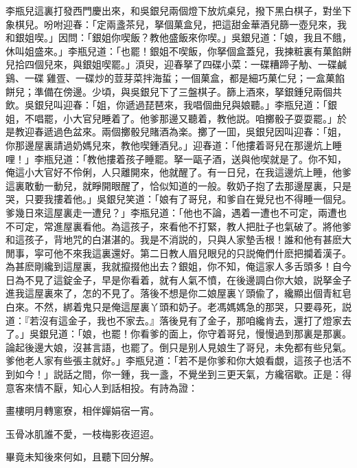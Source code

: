 李瓶兒這裏打發西門慶出來，和吳銀兒兩個燈下放炕桌兒，撥下黑白棋子，對坐下象棋兒。吩咐迎春：「定兩盞茶兒，拏個菓盒兒，把這甜金華酒兒篩一壺兒來，我和銀姐喫。」因問：「銀姐你喫飯？教他盛飯來你喫。」吳銀兒道：「娘，我且不餓，休叫姐盛來。」李瓶兒道：「也罷！銀姐不喫飯，你拏個盒蓋兒，我揀粧裏有菓餡餅兒拾四個兒來，與銀姐喫罷。」湏臾，迎春拏了四碟小菜：一碟糟蹄子觔、一碟鹹鷄、一碟𤓌雞疍、一碟炒的荳芽菜拌海蜇；一個菓盒，都是細巧菓仁兒；一盒菓餡餅兒；準備在傍邊。少頃，與吳銀兒下了三盤棋子。篩上酒來，拏銀鍾兒兩個共飲。吳銀兒叫迎春：「姐，你遞過琵琶來，我唱個曲兒與娘聽。」李瓶兒道：「銀姐，不唱罷，小大官兒睡着了。他爹那邊又聽着，教他説。咱擲骰子耍耍罷。」於是教迎春遞過色盆來。兩個擲骰兒賭酒為楽。擲了一囬，吳銀兒因叫迎春：「姐，你那邊屋裏請過奶媽兒來，教他喫鍾酒兒。」迎春道：「他摟着哥兒在那邊炕上睡哩！」李瓶兒道：「教他摟着孩子睡罷。拏一甌子酒，送與他喫就是了。你不知，俺這小大官好不伶俐，人只離開來，他就醒了。有一日兒，在我這邊炕上睡，他爹這裏敢動一動兒，就睜開眼醒了，恰似知道的一般。敎奶子抱了去那邊屋裏，只是哭，只要我摟着他。」吳銀兒笑道：「娘有了哥兒，和爹自在覺兒也不得睡一個兒。爹幾日來這屋裏走一遭兒？」李瓶兒道：「他也不論，遇着一遭也不可定，兩遭也不可定，常進屋裏看他。為這孩子，來看他不打緊，教人把肚子也氣破了。將他爹和這孩子，背地咒的白湛湛的。我是不消説的，只與人家墊舌根！誰和他有甚麽大閒事，寜可他不來我這裏還好。第二日教人眉兒眼兒的只説俺們什麽把攔着漢子。為甚麽剛纔到這屋裏，我就攛掇他出去？銀姐，你不知，俺這家人多舌頭多！自今日為不見了這錠金子，早是你看着，就有人氣不憤，在後邊調白你大娘，説拏金子進我這屋裏來了，怎的不見了。落後不想是你二娘屋裏丫頭偸了，纔顯出個青紅皂白來。不然，綁着鬼只是俺這屋裏丫頭和奶子。老馮媽媽急的那哭，只要尋死，説道：『若沒有這金子，我也不家去。』落後見有了金子，那咱纔肯去，還打了燈家去了。」吳銀兒道：「娘，也罷！你看爹的面上，你守着哥兒，慢慢過到那裏是那裏。論起後邊大娘，沒甚言語，也罷了。倒只是别人見娘生了哥兒，未免都有些兒氣。爹他老人家有些張主就好。」李瓶兒道：「若不是你爹和你大娘看覷，這孩子也活不到如今！」説話之間，你一鍾，我一盞，不覺坐到三更天氣，方纔宿歇。正是：得意客來情不厭，知心人到話相投。有詩為證：

\begin{myquote}
畫樓明月轉窻寮，相伴嬋娟宿一宵。

玉骨冰肌誰不愛，一枝梅影夜迢迢。
\end{myquote}

畢竟未知後來何如，且聽下回分解。

